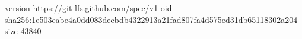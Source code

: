 version https://git-lfs.github.com/spec/v1
oid sha256:1e503eabe4a0dd083deebdb4322913a21fad807fa4d575ed31db65118302a204
size 43840
